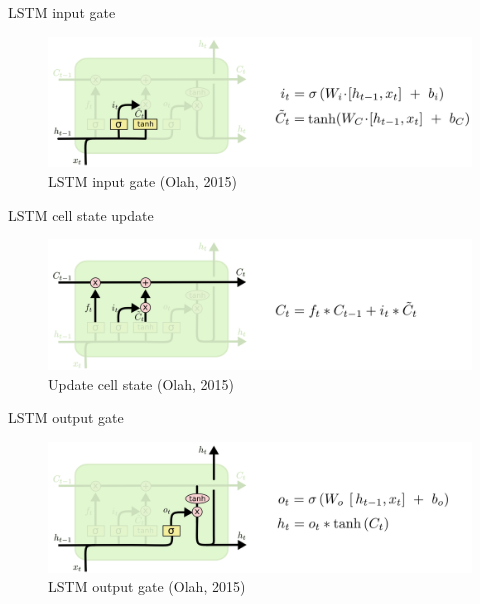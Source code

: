 \documentclass[10pt]{beamer}
\begin{document}
\begin{frame}{LSTM input gate}

\begin{figure}[h]
\centering
\includegraphics[width=1\textwidth]{fig/Olah_LSTM3_update.png}
\caption{LSTM input gate (Olah, 2015)}
\end{figure}

\end{frame}

\begin{frame}{LSTM cell state update}

\begin{figure}[h]
\centering
\includegraphics[width=1\textwidth]{fig/Olah_LSTM3_update2.png}
\caption{Update cell state (Olah, 2015)}
\end{figure}

\end{frame}

\begin{frame}{LSTM output gate}

\begin{figure}[h]
\centering
\includegraphics[width=1\textwidth]{fig/Olah_LSTM3_output.png}
\caption{LSTM output gate (Olah, 2015)}
\end{figure}

\end{frame}
\end{document}
